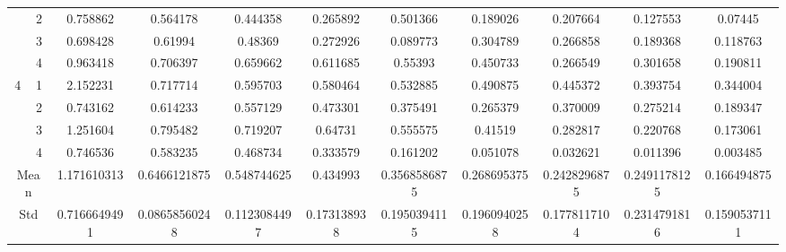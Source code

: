 \documentclass[draft,dvipsnames]{drexel-thesis}
\begin{document}
\begin{thesis}
\begin{table}[!t]
{\begin{tabular}{|c|c|c|c|c|c|c|c|c|c|c|}
                      & 2                   & 0.758862     & 0.564178      & 0.444358     & 0.265892    & 0.501366     & 0.189026     & 0.207664     & 0.127553     & 0.07445      \\ \cline{2-11} 
                      & 3                   & 0.698428     & 0.61994       & 0.48369      & 0.272926    & 0.089773     & 0.304789     & 0.266858     & 0.189368     & 0.118763     \\ \cline{2-11} 
                      & 4                   & 0.963418     & 0.706397      & 0.659662     & 0.611685    & 0.55393      & 0.450733     & 0.266549     & 0.301658     & 0.190811     \\ \hline
\multirow{4}{*}{4}    & 1                   & 2.152231     & 0.717714      & 0.595703     & 0.580464    & 0.532885     & 0.490875     & 0.445372     & 0.393754     & 0.344004     \\ \cline{2-11} 
                      & 2                   & 0.743162     & 0.614233      & 0.557129     & 0.473301    & 0.375491     & 0.265379     & 0.370009     & 0.275214     & 0.189347     \\ \cline{2-11} 
                      & 3                   & 1.251604     & 0.795482      & 0.719207     & 0.64731     & 0.555575     & 0.41519      & 0.282817     & 0.220768     & 0.173061     \\ \cline{2-11} 
                      & 4                   & 0.746536     & 0.583235      & 0.468734     & 0.333579    & 0.161202     & 0.051078     & 0.032621     & 0.011396     & 0.003485     \\ \hline
\multicolumn{2}{|c|}{Mean}                  & 1.171610313  & 0.6466121875  & 0.548744625  & 0.434993    & 0.3568586875 & 0.268695375  & 0.2428296875 & 0.2491178125 & 0.166494875  \\ \hline
\multicolumn{2}{|c|}{Std}                   & 0.7166649491 & 0.08658560248 & 0.1123084497 & 0.173138938 & 0.1950394115 & 0.1960940258 & 0.1778117104 & 0.2314791816 & 0.1590537111 \\ \hline
\end{tabular}}
\end{table}


\end{thesis}
\end{document}
